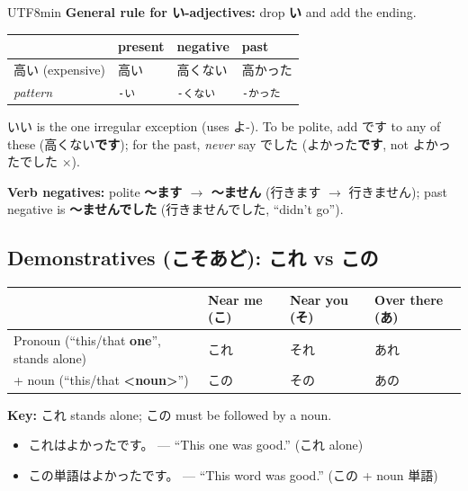 \documentclass[11pt]{article}
\begin{document}
\begin{CJK}{UTF8}{min}
\textbf{General rule for い-adjectives:} drop \textbf{い} and add the ending.
\begin{center}
\begin{tabular}{@{}llll@{}}
\toprule
 & present & negative & past \\
\midrule
高い (expensive) & 高い & 高くない & 高かった \\
\emph{pattern}   & \texttt{-い} & \texttt{-くない} & \texttt{-かった} \\
\bottomrule
\end{tabular}
\end{center}
いい is the one irregular exception (uses よ-). To be polite, add です to any of
these (高くない\textbf{です}); for the past, \emph{never} say でした
(よかった\textbf{です}, not よかったでした $\times$).

\textbf{Verb negatives:} polite \textbf{〜ます $\rightarrow$ 〜ません} (行きます
$\rightarrow$ 行きません); past negative is \textbf{〜ませんでした}
(行きませんでした, ``didn't go'').

\subsection{Demonstratives (\texorpdfstring{こそあど}{kosoado}): \texorpdfstring{これ}{kore} vs \texorpdfstring{この}{kono}}
\begin{center}
\begin{tabular}{@{}llll@{}}
\toprule
 & Near me (こ) & Near you (そ) & Over there (あ) \\
\midrule
Pronoun (``this/that \textbf{one}'', stands alone) & これ & それ & あれ \\
+ noun (``this/that \textbf{<noun>}'')             & この & その & あの \\
\bottomrule
\end{tabular}
\end{center}
\textbf{Key:} これ stands alone; この must be followed by a noun.
\begin{itemize}
  \item これはよかったです。 --- ``This one was good.'' (これ alone)
  \item この単語はよかったです。 --- ``This word was good.'' (この + noun 単語)
\end{itemize}


\end{CJK}
\end{document}
